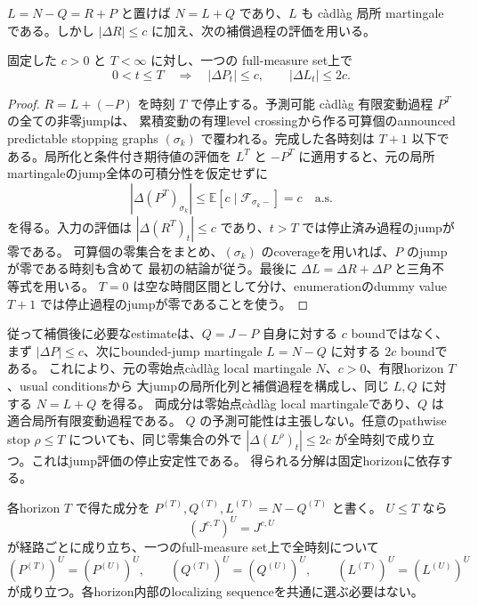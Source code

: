 $L=N-Q=R+P$ と置けば $N=L+Q$ であり、$L$ も c\`adl\`ag 局所 martingaleである。しかし
$|\Delta R|\leq c$ に加え、次の補償過程の評価を用いる。

\begin{lemma}
\label{lem:compensator-jump-bound}
固定した $c>0$ と $T<\infty$ に対し、一つの full-measure set上で
\[
 0<t\leq T\quad\Longrightarrow\quad
 |\Delta P_t|\leq c,
 \qquad |\Delta L_t|\leq 2c .
\]
\end{lemma}

\begin{proof}
$R=L+(-P)$ を時刻 $T$ で停止する。予測可能 c\`adl\`ag 有限変動過程 $P^T$ の全ての非零jumpは、
累積変動の有理level crossingから作る可算個のannounced predictable stopping graphs
$(\sigma_k)$ で覆われる。完成した各時刻は $T+1$ 以下である。局所化と条件付き期待値の評価を
$L^T$ と $-P^T$ に適用すると、元の局所martingaleのjump全体の可積分性を仮定せずに
\[
 |\Delta (P^T)_{\sigma_k}|
 \leq
 \mathbb E[c\mid\mathcal F_{\sigma_k-}]=c
 \quad\text{a.s.}
\]
を得る。入力の評価は $|\Delta(R^T)_t|\leq c$ であり、$t>T$ では停止済み過程のjumpが零である。
可算個の零集合をまとめ、$(\sigma_k)$ のcoverageを用いれば、$P$ のjumpが零である時刻も含めて
最初の結論が従う。最後に $\Delta L=\Delta R+\Delta P$ と三角不等式を用いる。
$T=0$ は空な時間区間として分け、enumerationのdummy value $T+1$ では停止過程のjumpが零であることを使う。
\end{proof}

従って補償後に必要なestimateは、$Q=J-P$ 自身に対する $c$ boundではなく、まず
$|\Delta P|\leq c$、次にbounded-jump martingale $L=N-Q$ に対する $2c$ boundである。
これにより、元の零始点c\`adl\`ag local martingale $N$、$c>0$、有限horizon $T$、usual conditionsから
大jumpの局所化列と補償過程を構成し、同じ $L,Q$ に対する $N=L+Q$ を得る。
両成分は零始点c\`adl\`ag local martingaleであり、$Q$ は適合局所有限変動過程である。
$Q$ の予測可能性は主張しない。任意のpathwise stop $\rho\leq T$ についても、同じ零集合の外で
$|\Delta(L^\rho)_t|\leq2c$ が全時刻で成り立つ。これはjump評価の停止安定性である。
得られる分解は固定horizonに依存する。

\begin{lemma}[Horizon間の整合性]
各horizon $T$ で得た成分を $P^{(T)},Q^{(T)},L^{(T)}=N-Q^{(T)}$ と書く。
$U\leq T$ なら
\[
 (J^{c,T})^U=J^{c,U}
\]
が経路ごとに成り立ち、一つのfull-measure set上で全時刻について
\[
 (P^{(T)})^U=(P^{(U)})^U,\qquad
 (Q^{(T)})^U=(Q^{(U)})^U,\qquad
 (L^{(T)})^U=(L^{(U)})^U
\]
が成り立つ。各horizon内部のlocalizing sequenceを共通に選ぶ必要はない。
\end{lemma}

